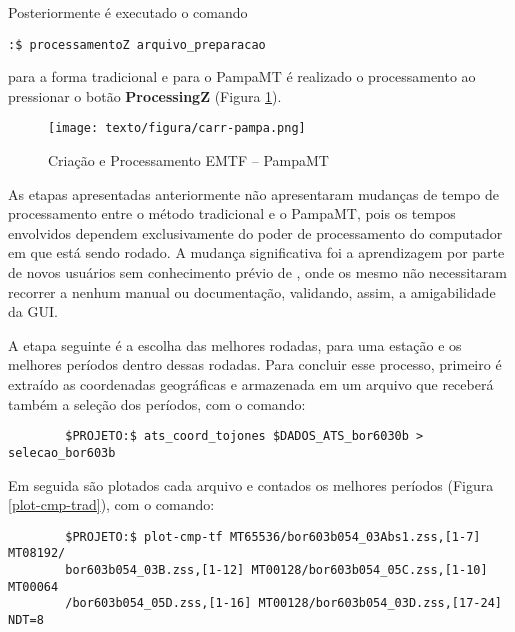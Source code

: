     Posteriormente é executado o comando \begin{footnotesize}\verb|:$ processamentoZ arquivo_preparacao|\end{footnotesize} para a forma tradicional e para o PampaMT é realizado o processamento ao pressionar o botão \textbf{ProcessingZ} (Figura \ref{carr-pampa}).
    
    \begin{figure}[H]
        \caption{Criação e Processamento EMTF -- PampaMT}
            \begin{center}
                \texttt{[image: texto/figura/carr-pampa.png]}
            \end{center}
        \legend{\Fonte{\oautor}}
        \label{carr-pampa}
    \end{figure}
    
    As etapas apresentadas anteriormente não apresentaram mudanças de tempo de processamento entre o método tradicional e o PampaMT, pois os tempos envolvidos dependem exclusivamente do poder de processamento do computador em que está sendo rodado. A mudança significativa foi a aprendizagem por parte de novos usuários sem conhecimento prévio de , onde os mesmo não necessitaram recorrer a nenhum manual ou documentação, validando, assim, a amigabilidade da GUI. 
    
    A etapa seguinte é a escolha das melhores rodadas, para uma estação e os melhores períodos dentro dessas rodadas. Para concluir esse processo, primeiro é extraído as coordenadas geográficas e armazenada em um arquivo que receberá também a seleção dos períodos, com o comando:
    
        \begin{footnotesize}        
\begin{verbatim}
        $PROJETO:$ ats_coord_tojones $DADOS_ATS_bor6030b > selecao_bor603b
\end{verbatim}
\end{footnotesize}

    \noindent Em seguida são plotados cada arquivo  e contados os melhores períodos (Figura \ref{plot-cmp-trad}), com o comando:
    
    \begin{footnotesize}        
\begin{verbatim}
        $PROJETO:$ plot-cmp-tf MT65536/bor603b054_03Abs1.zss,[1-7] MT08192/
        bor603b054_03B.zss,[1-12] MT00128/bor603b054_05C.zss,[1-10] MT00064
        /bor603b054_05D.zss,[1-16] MT00128/bor603b054_03D.zss,[17-24] NDT=8
\end{verbatim}
\end{footnotesize}
    
